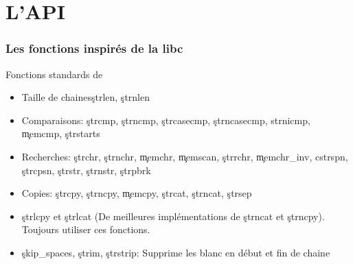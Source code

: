 %
%
%

\part{L'API}

\begin{frame}
  \partpage
\end{frame}

\begin{frame}
  \tableofcontents[currentpart]
\end{frame}

\section{Les fonctions inspirés de la libc}

\begin{frame}{Fonctions standards de }
  \begin{itemize} 
  \item Taille de chaines\c{strlen}, \c{strnlen}
  \item   Comparaisons:   \c{strcmp},   \c{strncmp},   \c{strcasecmp},
    \c{strncasecmp}, \c{ strnicmp}, \c{memcmp}, \c{strstarts}
  \item Recherches:  \c{strchr}, \c{strnchr}, \c{memchr}, \c{memscan},
    \c{strrchr},  \c{memchr_inv}, c{strspn},  \c{strcpsn}, \c{strstr},
    \c{strnstr}, \c{strpbrk}
  \item  Copies:   \c{strcpy},  \c{strncpy},  \c{memcpy},  \c{strcat},
    \c{strncat}, \c{strsep}
  \item \c{strlcpy}  et \c{strlcat} (De  meilleures implémentations de
    \c{strncat} et \c{strncpy}). Toujours utiliser ces fonctions.
  \item \c{skip_spaces},  \c{strim}, \c{strstrip}: Supprime  les blanc
    en début et fin de chaine
  \end{itemize}
\end{frame}

